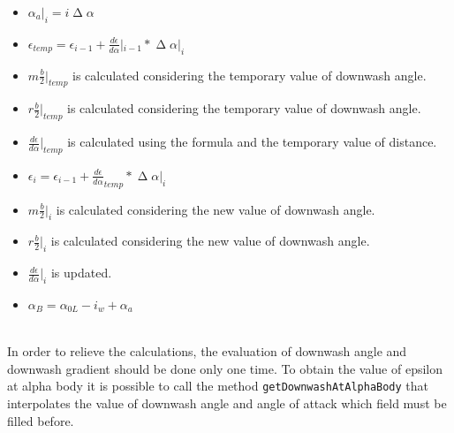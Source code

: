 \begin{enumerate}
\begin{itemize}
\item $\alpha_a|_i = i \upDelta \alpha$ 
\item $\epsilon_{temp}= \epsilon_{i-1} + \frac{d\epsilon}{d\alpha} |_{i-1} *  \upDelta \alpha |_i $%
\item  $m  \frac{b}{2}| _{temp} $  is calculated considering the temporary value of downwash angle.
\item  $r  \frac{b}{2}| _{temp} $  is calculated considering the temporary value of downwash angle.
\item $\frac{d\epsilon}{d\alpha}|_{temp}$  is calculated using the formula and the temporary value of distance.
\item $\epsilon_{i}=  \epsilon_{i-1} + \frac{d\epsilon}{d\alpha}_{temp} * \upDelta  \alpha|_i $ 
\item  $m  \frac{b}{2}| _{i} $  is calculated considering the new value of downwash angle.
\item  $r \frac{b}{2}| _{i} $  is calculated considering the new value of downwash angle.
\item $\frac{d\epsilon}{d\alpha}|_{i}$  is updated.
\item $\alpha_B =\alpha_{0L} - i_w + \alpha_a $ 
\end{itemize}

\end{enumerate}

\noindent \\
In order to relieve the calculations, the evaluation of downwash angle and downwash gradient should be done only one time. To obtain the value of epsilon at alpha body it is possible to call the method  \texttt{getDownwashAtAlphaBody} that interpolates the value of downwash angle and angle of attack which field must be filled before.\\ 




